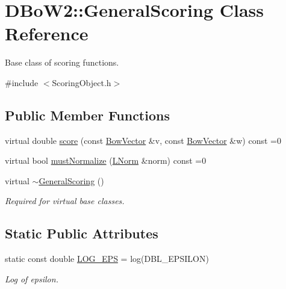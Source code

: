 \hypertarget{classDBoW2_1_1GeneralScoring}{}\section{D\+Bo\+W2\+:\+:General\+Scoring Class Reference}
\label{classDBoW2_1_1GeneralScoring}


Base class of scoring functions.  




{\ttfamily \#include $<$Scoring\+Object.\+h$>$}

\subsection*{Public Member Functions}
\begin{DoxyCompactItemize}
\item 
virtual double \hyperlink{classDBoW2_1_1GeneralScoring_a43b3f5fedb19e6a19e17b9813efd17e8}{score} (const \hyperlink{classDBoW2_1_1BowVector}{Bow\+Vector} \&v, const \hyperlink{classDBoW2_1_1BowVector}{Bow\+Vector} \&w) const =0
\item 
virtual bool \hyperlink{classDBoW2_1_1GeneralScoring_ab0cadafd50b0f2f559f6325a6944f72f}{must\+Normalize} (\hyperlink{namespaceDBoW2_a53e9e0bcfc25c861815e413a7cf3fa51}{L\+Norm} \&norm) const =0
\item 
\mbox{\label{classDBoW2_1_1GeneralScoring_a1796812280a5188e06d8137baa977776}} 
virtual \hyperlink{classDBoW2_1_1GeneralScoring_a1796812280a5188e06d8137baa977776}{$\sim$\+General\+Scoring} ()
\begin{DoxyCompactList}\small\item\em Required for virtual base classes. \end{DoxyCompactList}\end{DoxyCompactItemize}
\subsection*{Static Public Attributes}
\begin{DoxyCompactItemize}
\item 
\mbox{\label{classDBoW2_1_1GeneralScoring_af470bccf750689525622f216f07d6f3c}} 
static const double \hyperlink{classDBoW2_1_1GeneralScoring_af470bccf750689525622f216f07d6f3c}{L\+O\+G\+\_\+\+E\+PS} = log(D\+B\+L\+\_\+\+E\+P\+S\+I\+L\+ON)
\begin{DoxyCompactList}\small\item\em Log of epsilon. \end{DoxyCompactList}\end{DoxyCompactItemize}


